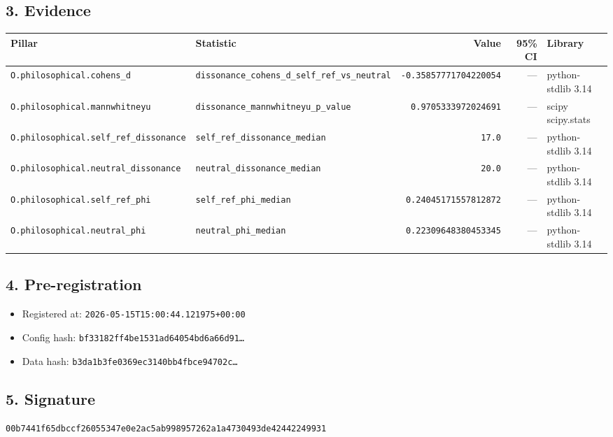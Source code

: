 \documentclass{article}
\begin{document}
\subsection*{3. Evidence}
\begin{tabular}{llrrl}\toprule
\textbf{Pillar} & \textbf{Statistic} & \textbf{Value} & \textbf{95\% CI} & \textbf{Library} \\\midrule
\texttt{O.philosophical.cohens\_d} & \texttt{dissonance\_cohens\_d\_self\_ref\_vs\_neutral} & \texttt{-0.35857771704220054} & --- & python-stdlib 3.14 \\
\texttt{O.philosophical.mannwhitneyu} & \texttt{dissonance\_mannwhitneyu\_p\_value} & \texttt{0.9705333972024691} & --- & scipy scipy.stats \\
\texttt{O.philosophical.self\_ref\_dissonance} & \texttt{self\_ref\_dissonance\_median} & \texttt{17.0} & --- & python-stdlib 3.14 \\
\texttt{O.philosophical.neutral\_dissonance} & \texttt{neutral\_dissonance\_median} & \texttt{20.0} & --- & python-stdlib 3.14 \\
\texttt{O.philosophical.self\_ref\_phi} & \texttt{self\_ref\_phi\_median} & \texttt{0.24045171557812872} & --- & python-stdlib 3.14 \\
\texttt{O.philosophical.neutral\_phi} & \texttt{neutral\_phi\_median} & \texttt{0.22309648380453345} & --- & python-stdlib 3.14 \\
\bottomrule\end{tabular}
\subsection*{4. Pre-registration}
\begin{itemize}
\item Registered at: \texttt{2026-05-15T15:00:44.121975+00:00}
\item Config hash: \texttt{bf33182ff4be1531ad64054bd6a66d91\dots}
\item Data hash: \texttt{b3da1b3fe0369ec3140bb4fbce94702c\dots}
\end{itemize}
\subsection*{5. Signature}
\texttt{00b7441f65dbccf26055347e0e2ac5ab998957262a1a4730493de42442249931}\\
\end{document}
